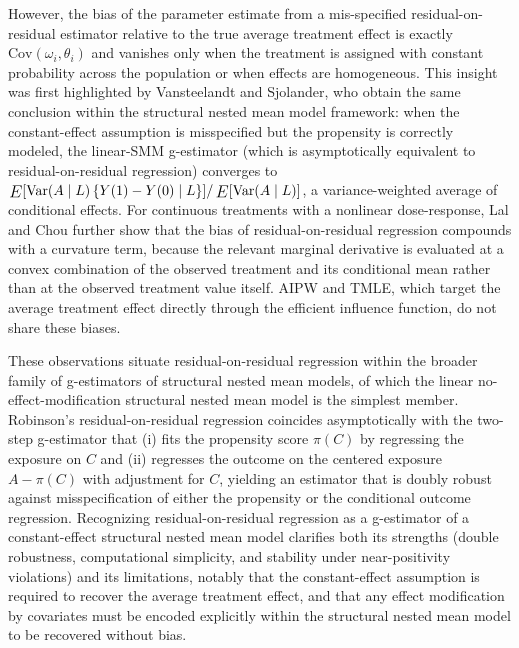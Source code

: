\documentclass[12pt]{article}
\newcommand{\E}{\mathop{\vcenter{\hbox{\relsize{+1}$E$}}}}
\begin{document}
However, the bias of the parameter estimate from a mis-specified residual-on-residual estimator relative to the true average treatment effect is exactly $\text{Cov}(\omega_i, \theta_i)$ and vanishes only when the treatment is assigned with constant probability across the population or when effects are homogeneous.\cite{LalChou2026} This insight was first highlighted  by Vansteelandt and Sjolander, who obtain the same conclusion within the structural nested mean model framework: when the constant-effect assumption is misspecified but the propensity is correctly modeled, the linear-SMM g-estimator (which is asymptotically equivalent to residual-on-residual regression) converges to $\E[\text{Var}(A \mid L) \, \{Y(1) - Y(0) \mid L\}] / \E[\text{Var}(A \mid L)]$, a variance-weighted average of conditional effects.\cite{VansteelandtSjolander2016} For continuous treatments with a nonlinear dose-response, Lal and Chou further show that the bias of residual-on-residual regression compounds with a curvature term, because the relevant marginal derivative is evaluated at a convex combination of the observed treatment and its conditional mean rather than at the observed treatment value itself.\cite{LalChou2026} AIPW and TMLE, which target the average treatment effect directly through the efficient influence function, do not share these biases.

These observations situate residual-on-residual regression within the broader family of g-estimators of structural nested mean models, of which the linear no-effect-modification structural nested mean model is the simplest member.\cite{VansteelandtSjolander2016} Robinson's residual-on-residual regression coincides asymptotically with the two-step g-estimator that (i) fits the propensity score $\pi(C)$ by regressing the exposure on $C$ and (ii) regresses the outcome on the centered exposure $A - \pi(C)$ with adjustment for $C$, yielding an estimator that is doubly robust against misspecification of either the propensity or the conditional outcome regression.\cite{VansteelandtSjolander2016} Recognizing residual-on-residual regression as a g-estimator of a constant-effect structural nested mean model clarifies both its strengths (double robustness, computational simplicity, and stability under near-positivity violations) and its limitations, notably that the constant-effect assumption is required to recover the average treatment effect, and that any effect modification by covariates must be encoded explicitly within the structural nested mean model to be recovered without bias.
\end{document}
